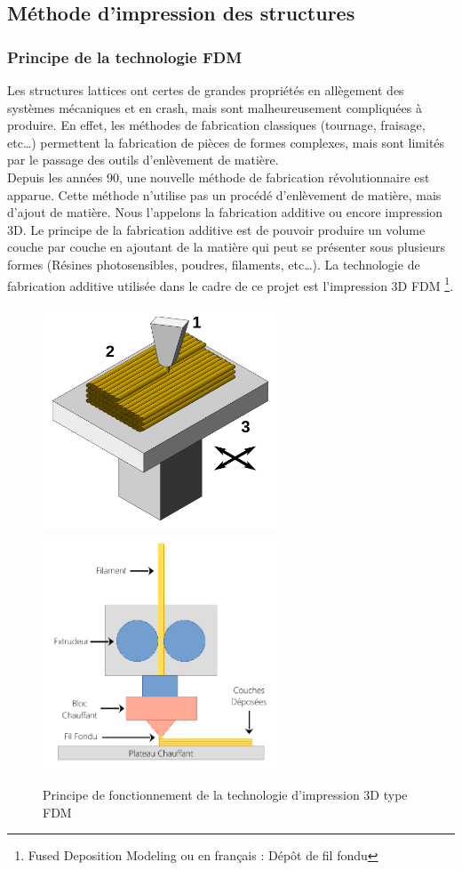 \documentclass[a4paper]{article}
\begin{document}
	\subsection{Méthode d'impression des structures}
	\subsubsection{Principe de la technologie FDM}
	\hspace{0.5cm}Les structures lattices ont certes de grandes propriétés en allègement des systèmes mécaniques et en crash, mais sont malheureusement compliquées à produire. En effet, les méthodes de fabrication classiques (tournage, fraisage, etc…) permettent la fabrication de pièces de formes complexes, mais sont limités par le passage des outils d’enlèvement de matière.\\
	
	Depuis les années 90, une nouvelle méthode de fabrication révolutionnaire est apparue. Cette méthode n’utilise pas un procédé d’enlèvement de matière, mais d’ajout de matière. Nous l’appelons la fabrication additive ou encore impression 3D. Le principe de la fabrication additive est de pouvoir produire un volume couche par couche en ajoutant de la matière qui peut se présenter sous plusieurs formes (Résines photosensibles, poudres, filaments, etc…). La technologie de fabrication additive utilisée dans le cadre de ce projet est l’impression 3D FDM \label{imp_3D}\footnote{Fused Deposition Modeling ou en français : Dépôt de fil fondu}.
	
	\begin{figure}[H]
		\centering
		\includegraphics[width=7cm]{Images/4/FDM_printing.pdf}
		\includegraphics[width=7cm]{Images/4/impression_3D_schema.pdf}
		\caption{Principe de fonctionnement de la technologie d’impression 3D type FDM \cite{principe_fdm}}
	\end{figure}
	
\end{document}
